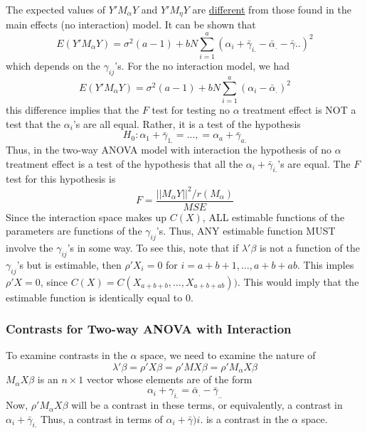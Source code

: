 \documentclass[12pt]{article}
\numberwithin{equation}{section}
\begin{document}
The expected values of $Y' M_\alpha Y$ and $Y' M_\eta Y$ are \underline{different} from those found in the main effects (no interaction) model. It can be shown that
%
\begin{equation*}
  E(Y' M_\alpha Y) = \sigma^2 (a - 1) + bN \sum_{i=1}^a(\alpha_i + \bar{\gamma}_{i.} - \bar{\alpha}_. - \bar{\gamma}..)^2
\end{equation*}
%
which depends on the $\gamma_{ij}$'s. For the no interaction model, we had
%
\begin{equation*}
  E(Y' M_\alpha Y) = \sigma^2(a-1) + bN \sum_{i=1}^a (\alpha_i - \bar{\alpha}_.)^2
\end{equation*}
%
this difference implies that the $F$ test for testing no $\alpha$ treatment effect is NOT a test that the $\alpha_i$'s are all equal. Rather, it is a test of the hypothesis
\begin{equation*}
  H_0: \alpha_1 + \bar{\gamma}_{1.} = \ldots, = \alpha_a + \bar{\gamma}_{a.}
\end{equation*}
%
Thus, in the two-way ANOVA model with interaction the hypothesis of no $\alpha$ treatment effect is a test of the hypothesis that all the $\alpha_i + \bar{\gamma}_{i.}$'s are equal. The $F$ test for this hypothesis is
\begin{equation*}
  F = \frac{||M_\alpha Y||^2 / r(M_\alpha)}{MSE}
\end{equation*}
%
Since the interaction space makes up $C(X)$, ALL estimable functions of the parameters are functions of the $\gamma_{ij}$'s. Thus, ANY estimable function MUST involve the $\gamma_{ij}$'s in some way. To see this, note that if $\lambda ' \beta$ is not a function of the $\gamma_{ij}$'s but is estimable, then  $\rho' X_i = 0$ for $i = a + b + 1, \ldots, a + b + ab$. This imples $\rho'X = 0$, since $C(X) = C(X_{a+b+b}, \ldots, X_{a + b + ab}))$. This would imply that the estimable function is identically equal to 0. 

\subsubsection{Contrasts for Two-way ANOVA with Interaction}
To examine contrasts in the $\alpha$ space, we need to examine the nature of 
\begin{equation*}
  \lambda' \beta = \rho' X \beta = \rho' M X \beta = \rho'M_\alpha X \beta
\end{equation*}
$M_\alpha X \beta$ is an $n \times 1$ vector whose elements are of the form
%
\begin{equation*}
  \alpha_i + \gamma_{i.} = \bar{\alpha}_{.} - \bar{\gamma}_{..}
\end{equation*}
%
Now, $\rho'M_\alpha X \beta$ will be a contrast in these terms, or equivalently, a contrast in $\alpha_i + \bar{\gamma}_{i.}$ Thus, a contrast in terms of $\alpha_i + \bar{\gamma}){i.}$ is a contrast in the $\alpha$ space.
\end{document}
